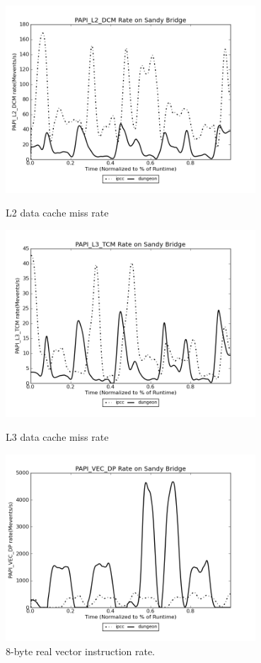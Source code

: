 \begin{figure}
\centering
\begin{minipage}{1.\textwidth}
   \begin{center}
   \includegraphics[width=1.\linewidth,height=7cm]{figures/perfTestWACCM-PAPI_L2_DCM.png}
   \caption{L2 data cache miss rate}
   \end{center}
\end{minipage}
\begin{minipage}{1.\textwidth}
   \begin{center}
   \includegraphics[width=1.\linewidth,height=7cm]{figures/perfTestWACCM-PAPI_L3_TCM.png}
   \caption{L3 data cache miss rate}
   \end{center}
\end{minipage}
\begin{minipage}{1.\textwidth}
   \begin{center}
   \includegraphics[width=1.\linewidth,height=7cm]{figures/perfTestWACCM-PAPI_VEC_DP.png}
   \caption{8-byte real vector instruction rate.}
   \end{center}
\end{minipage}
\end{figure}


